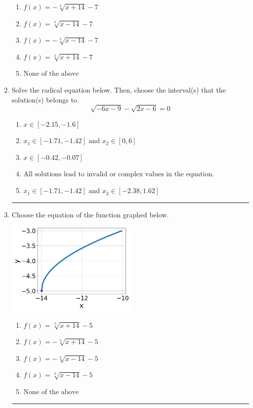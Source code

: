 \documentclass[14pt]{extbook}
\newcommand{\litem}[1]{\item#1\hspace*{-1cm}\rule{\textwidth}{0.4pt}}
\begin{document}
\begin{enumerate}
{\begin{center}
\end{center}
\begin{enumerate}[label=\Alph*.]
\item \( f(x) = - \sqrt[3]{x + 14} - 7 \)
\item \( f(x) = \sqrt[3]{x - 14} - 7 \)
\item \( f(x) = - \sqrt[3]{x - 14} - 7 \)
\item \( f(x) = \sqrt[3]{x + 14} - 7 \)
\item \( \text{None of the above} \)

\end{enumerate} }
\litem{
Solve the radical equation below. Then, choose the interval(s) that the solution(s) belongs to.\[ \sqrt{-6 x - 9} - \sqrt{2 x - 6} = 0 \]\begin{enumerate}[label=\Alph*.]
\item \( x \in [-2.15,-1.6] \)
\item \( x_1 \in [-1.71, -1.42] \text{ and } x_2 \in [0,6] \)
\item \( x \in [-0.42,-0.07] \)
\item \( \text{All solutions lead to invalid or complex values in the equation.} \)
\item \( x_1 \in [-1.71, -1.42] \text{ and } x_2 \in [-2.38,1.62] \)

\end{enumerate} }
\litem{
Choose the equation of the function graphed below.
\begin{center}
    \includegraphics[width=0.5\textwidth]{../Figures/radicalGraphToEquationCopyB.png}
\end{center}
\begin{enumerate}[label=\Alph*.]
\item \( f(x) = \sqrt[3]{x + 14} - 5 \)
\item \( f(x) = - \sqrt[3]{x + 14} - 5 \)
\item \( f(x) = - \sqrt[3]{x - 14} - 5 \)
\item \( f(x) = \sqrt[3]{x - 14} - 5 \)
\item \( \text{None of the above} \)


\end{enumerate}}
\end{enumerate}
\end{document}
